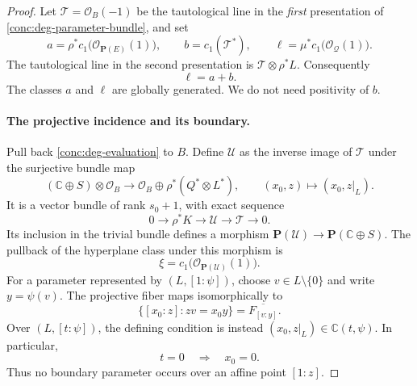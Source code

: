 \begin{proof}
Let \(\mathcal T=\mathcal O_B(-1)\) be the tautological line
in the \emph{first} presentation of
\eqref{conc:deg-parameter-bundle}, and set
\[
 a=\rho^*c_1\bigl(\mathcal O_{\mathbf{P}(E)}(1)\bigr),
 \qquad b=c_1(\mathcal T^*),
 \qquad \ell=\mu^*c_1\bigl(\mathcal O_{\mathcal Q}(1)\bigr).
\]
The tautological line in the second presentation is
\(\mathcal T\otimes\rho^*L\).  Consequently
\begin{equation}
 \ell=a+b.
 \label{conc:deg-hyperplane}
\end{equation}
The classes \(a\) and \(\ell\) are globally generated.  We do
not need positivity of \(b\).

\paragraph{The projective incidence and its boundary.}
Pull back \eqref{conc:deg-evaluation} to \(B\).  Define
\(\mathcal U\) as the inverse image of \(\mathcal T\)
under the surjective bundle map
\[
 (\mathbb{C}\oplus S)\otimes\mathcal O_B
 \longrightarrow
 \mathcal O_B\oplus\rho^*(Q^*\otimes L^*),
 \qquad (x_0,z)\longmapsto(x_0,z|_L).
\]
It is a vector bundle of rank \(s_0+1\), with exact sequence
\begin{equation}
 0\longrightarrow\rho^*K\longrightarrow\mathcal U
 \longrightarrow\mathcal T\longrightarrow0.
 \label{conc:deg-incidence-bundle}
\end{equation}
Its inclusion in the trivial bundle defines a morphism
\(\mathbf{P}(\mathcal U)\to\mathbf{P}(\mathbb{C}\oplus S)\).
The pullback of the hyperplane class under this morphism is
\[
 \xi=c_1\bigl(\mathcal O_{\mathbf{P}(\mathcal U)}(1)\bigr).
\]
For a parameter represented by \((L,[1:\psi])\), choose
\(v\in L\setminus\{0\}\) and write \(y=\psi(v)\).
The projective fiber maps isomorphically to
\begin{equation}
 \{[x_0:z]:zv=x_0y\}=\overline{F_{[v:y]}}.
 \label{conc:deg-flat-closure}
\end{equation}
Over \((L,[t:\psi])\), the defining condition is instead
\((x_0,z|_L)\in\mathbb{C}(t,\psi)\).  In particular,
\begin{equation}
 t=0\quad\Longrightarrow\quad x_0=0.
 \label{conc:deg-boundary}
\end{equation}
Thus no boundary parameter occurs over an affine point \([1:z]\).


\end{proof}
